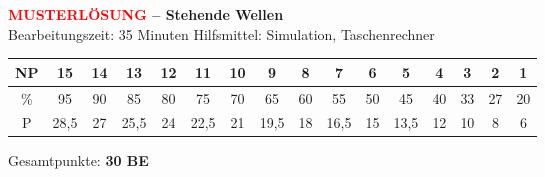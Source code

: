 \documentclass[11pt,a4paper]{article}
\begin{document}
\begin{center}
\Large\textbf{\textcolor{red}{MUSTERLÖSUNG} -- Stehende Wellen}\\[0.2cm]
\small Bearbeitungszeit: 35 Minuten \hfill Hilfsmittel: Simulation, Taschenrechner
\end{center}

\vspace{0.2cm}

\begin{center}
\tiny
\begin{tabular}{|c|c|c|c|c|c|c|c|c|c|c|c|c|c|c|c|}
\hline
NP & 15 & 14 & 13 & 12 & 11 & 10 & 9 & 8 & 7 & 6 & 5 & 4 & 3 & 2 & 1 \\
\hline
\% & 95 & 90 & 85 & 80 & 75 & 70 & 65 & 60 & 55 & 50 & 45 & 40 & 33 & 27 & 20 \\
\hline
P & 28,5 & 27 & 25,5 & 24 & 22,5 & 21 & 19,5 & 18 & 16,5 & 15 & 13,5 & 12 & 10 & 8 & 6 \\
\hline
\end{tabular}
\end{center}

\begin{center}
\small Gesamtpunkte: \textbf{30 BE}
\end{center}

\vspace{0.3cm}
\end{document}
